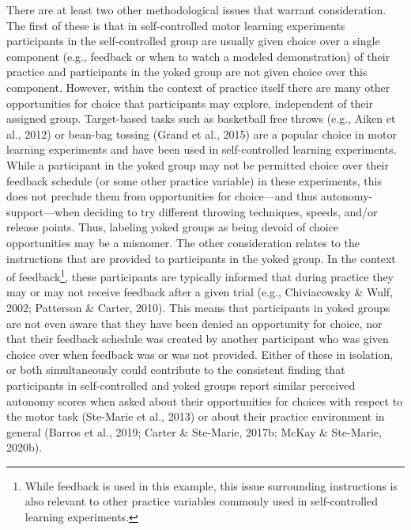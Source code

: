 \documentclass[
  english,
  jou]{apa7}
\begin{document}
There are at least two other methodological issues that warrant consideration. The first of these is that in self-controlled motor learning experiments participants in the self-controlled group are usually given choice over a single component (e.g., feedback or when to watch a modeled demonstration) of their practice and participants in the yoked group are not given choice over this component. However, within the context of practice itself there are many other opportunities for choice that participants may explore, independent of their assigned group. Target-based tasks such as basketball free throws (e.g., Aiken et al., 2012) or bean-bag tossing (Grand et al., 2015) are a popular choice in motor learning experiments and have been used in self-controlled learning experiments. While a participant in the yoked group may not be permitted choice over their feedback schedule (or some other practice variable) in these experiments, this does not preclude them from opportunities for choice---and thus autonomy-support---when deciding to try different throwing techniques, speeds, and/or release points. Thus, labeling yoked groups as being devoid of choice opportunities may be a misnomer. The other consideration relates to the instructions that are provided to participants in the yoked group. In the context of feedback\footnote{While feedback is used in this example, this issue surrounding instructions is also relevant to other practice variables commonly used in self-controlled learning experiments.}, these participants are typically informed that during practice they may or may not receive feedback after a given trial (e.g., Chiviacowsky \& Wulf, 2002; Patterson \& Carter, 2010). This means that participants in yoked groups are not even aware that they have been denied an opportunity for choice, nor that their feedback schedule was created by another participant who was given choice over when feedback was or was not provided. Either of these in isolation, or both simultaneously could contribute to the consistent finding that participants in self-controlled and yoked groups report similar perceived autonomy scores when asked about their opportunities for choices with respect to the motor task (Ste-Marie et al., 2013) or about their practice environment in general (Barros et al., 2019; Carter \& Ste-Marie, 2017b; McKay \& Ste-Marie, 2020b).
\end{document}
